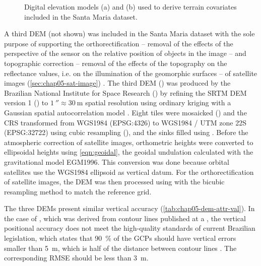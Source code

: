 \begin{figure}[!ht]
\begin{minipage}[b]{0.45\textwidth}
\end{minipage} 
\caption[Digital elevation models included in the Santa Maria dataset.]{Digital elevation models (a) \demOld{} 
and (b) \demNew{} used to derive terrain covariates included in the Santa Maria dataset.}
\label{fig:chap05-dem}
\end{figure}

A third DEM (not shown) was included in the Santa Maria dataset with the sole purpose of supporting the 
orthorectification -- removal of the effects of the perspective of the sensor on the relative position of 
objects in the image -- and topographic correction -- removal of the effects of the topography on the 
reflectance values, i.e. on the illumination of the geomorphic surfaces -- of satellite images 
(\autoref{sec:chap05-sat-image}) \cite{Mather2004, Schowengerdt2007}. The third DEM (\topodata) was produced 
by the Brazilian National Institute for Space Research (\inpe) by refining the SRTM DEM version 1 
() to $\SI{1}{\arcsecond} \approx \SI{30}{\m}$ spatial resolution using ordinary kriging with a 
Gaussian spatial autocorrelation model \cite{ValerianoEtAl2012}. Eight tiles were mosaicked 
() and the CRS transformed from WGS1984 (EPSG:4326) to WGS1984 / UTM zone 22S 
(EPSG:32722) using cubic resampling (), and the sinks filled using . Before 
the atmospheric correction of satellite images, orthometric heights were converted to ellipsoidal heights 
using \autoref{eqn:geoidal}, the geoidal undulation calculated with the gravitational model EGM1996. This 
conversion was done because orbital satellites use the WGS1984 ellipsoid as vertical datum. For the 
orthorectification of satellite images, the DEM was then processed using  with the 
bicubic resampling method to match the reference grid.

The three DEMs present similar vertical accuracy (\autoref{tab:chap05-dem-attr-val}). In the case of 
\demNew{}, which was derived from contour lines published at a , the vertical positional accuracy 
does not meet the high-quality standards of current Brazilian legislation, which states that 
\SI{90}{\percent} of the GCPs should have vertical errors smaller than \SI{5}{\metre}, which is half of the 
distance between contour lines \cite{Brasil1984}. The corresponding RMSE should be less than \SI{3}{\metre}.


